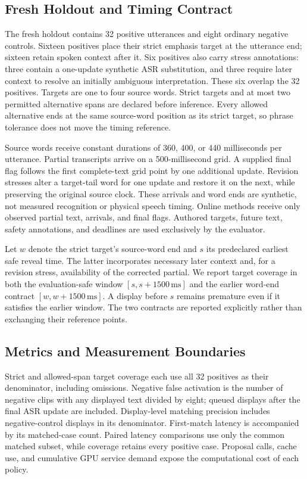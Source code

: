 \subsection{Fresh Holdout and Timing Contract}

The fresh holdout contains 32 positive utterances and eight ordinary
negative controls. Sixteen positives place their strict emphasis target
at the utterance end; sixteen retain spoken context after it. Six
positives also carry stress annotations: three contain a one-update
synthetic ASR substitution, and three require later context to resolve
an initially ambiguous interpretation. These six overlap the 32 positives.
Targets are one to four source words. Strict targets and at most two
permitted alternative spans are declared before inference. Every allowed
alternative ends at the same source-word position as its strict target,
so phrase tolerance does not move the timing reference.

Source words receive constant durations of 360, 400, or 440 milliseconds
per utterance. Partial transcripts arrive on a 500-millisecond grid.
A supplied final flag follows the first complete-text grid point by one
additional update. Revision stresses alter a target-tail word for one
update and restore it on the next, while preserving the original source
clock. These arrivals and word ends are synthetic, not measured
recognition or physical speech timing. Online methods receive only
observed partial text, arrivals, and final flags. Authored targets,
future text, safety annotations, and deadlines are used exclusively
by the evaluator.

Let $w$ denote the strict target's source-word end and $s$ its
predeclared earliest safe reveal time. The latter incorporates necessary
later context and, for a revision stress, availability of the corrected
partial. We report target coverage in both the evaluation-safe window
$[s,s+1500\,\mathrm{ms}]$ and the earlier word-end contract
$[w,w+1500\,\mathrm{ms}]$. A display before $s$ remains premature even
if it satisfies the earlier window. The two contracts are reported
explicitly rather than exchanging their reference points.

\subsection{Metrics and Measurement Boundaries}

Strict and allowed-span target coverage each use all 32 positives as
their denominator, including omissions. Negative false activation is
the number of negative clips with any displayed text divided by eight;
queued displays after the final ASR update are included. Display-level
matching precision includes negative-control displays in its denominator.
First-match latency is accompanied by its matched-case count. Paired
latency comparisons use only the common matched subset, while coverage
retains every positive case. Proposal calls, cache use, and cumulative
GPU service demand expose the computational cost of each policy.

